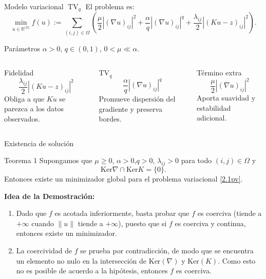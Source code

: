 \documentclass[9pt]{beamer}
\newcommand{\R}{\mathbb{R}}
\newcommand{\TV}{\operatorname{TV}}
\newcommand{\abs}[1]{\left\lvert #1\right\rvert}
\begin{document}
\begin{frame}{Modelo variacional \(\TV_q\)}
El problema es:
\begin{equation}
 \min_{u\in\R^{|\Omega|}} f(u):=
\sum_{(i,j)\in\Omega}
\left(
\frac{\mu}{2}\abs{(\nabla u)_{ij}}^2
+\frac{\alpha}{q}\abs{(\nabla u)_{ij}}^q
+\frac{\lambda_{ij}}{2}\abs{(Ku-z)_{ij}}^2
\right).   
\label{2.1pv}
\end{equation}
\begin{block}{Parámetros}
    $\alpha>0$, $q\in (0,1)$, $0<\mu\ll \alpha$. 
\end{block}
\begin{columns}[T]
\begin{block}{Fidelidad}
\[
\frac{\lambda_{ij}}{2}|(Ku-z)_{ij}|^2
\]
Obliga a que \(Ku\) se parezca a los datos observados.
\end{block}

\begin{block}{TV\(_q\)}
\[
\frac{\alpha}{q}|(\nabla u)_{ij}|^q
\]
Promueve dispersión del gradiente y preserva bordes.
\end{block}

\begin{block}{Término extra}
\[
\frac{\mu}{2}|(\nabla u)_{ij}|^2
\]
Aporta suavidad y estabilidad adicional.
\end{block}
\end{columns}
\end{frame}

\begin{frame}{Existencia de solución}
\begin{block}{Teorema 1}
    Supongamos que $\mu\geq 0$, $\alpha>0$,$q>0$, $\lambda_{ij}>0$ para todo $(i,j)\in\Omega$ y 
    $$
    \mathrm{Ker}\nabla \cap \mathrm{Ker} K=\{0\}.
    $$
    Entonces existe un minimizador global para el problema variacional \eqref{2.1pv}.
\end{block}

\textbf{Idea de la Demostración:}
    \begin{enumerate}
        \item Dado que $f$ es acotada inferiormente, basta probar que $f$ es coerciva (tiende a $+\infty$ cuando $\|u\|$ tiende a $+\infty$), puesto que si $f$ es coerciva y continua, entonces existe un minimizador. 
        \item La coercividad de $f$ se prueba por contradicción, de modo que se encuentra un elemento no nulo en la intersección de $\mathrm{Ker}(\nabla)$ y $\mathrm{Ker}(K)$. Como esto no es posible de acuerdo a la hipótesis, entonces $f$ es coerciva. 
    \end{enumerate}
\end{frame}
\end{document}
